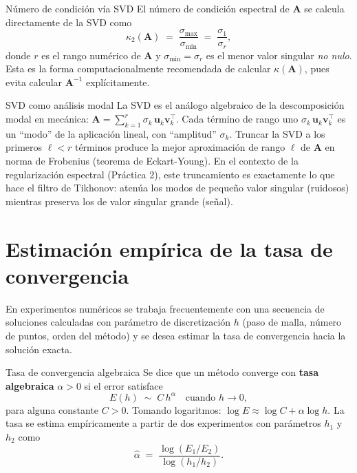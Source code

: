 \begin{proposicion}{Número de condición vía SVD}
\label{prop:cond_svd}
El número de condición espectral de $\mathbf{A}$ se calcula directamente
de la SVD como
\[
  \kappa_2(\mathbf{A}) \;=\; \frac{\sigma_{\max}}{\sigma_{\min}} \;=\; \frac{\sigma_1}{\sigma_r},
\]
donde $r$ es el rango numérico de $\mathbf{A}$ y $\sigma_{\min} = \sigma_r$
es el menor valor singular \emph{no nulo}. Esta es la forma computacionalmente
recomendada de calcular $\kappa(\mathbf{A})$, pues evita calcular
$\mathbf{A}^{-1}$ explícitamente.
\end{proposicion}

\begin{fisicaconexion}{SVD como análisis modal}
La SVD es el análogo algebraico de la descomposición modal en mecánica:
$\mathbf{A} = \sum_{k=1}^r \sigma_k\, \mathbf{u}_k \mathbf{v}_k^\top$.
Cada término de rango uno $\sigma_k\,\mathbf{u}_k\mathbf{v}_k^\top$ es un
``modo'' de la aplicación lineal, con ``amplitud'' $\sigma_k$. Truncar
la SVD a los primeros $\ell < r$ términos produce la mejor aproximación de
rango $\ell$ de $\mathbf{A}$ en norma de Frobenius (teorema de Eckart-Young).
En el contexto de la regularización espectral (Práctica 2), este truncamiento
es exactamente lo que hace el filtro de Tikhonov: atenúa los modos de
pequeño valor singular (ruidosos) mientras preserva los de valor singular
grande (señal).
\end{fisicaconexion}

\section{Estimación empírica de la tasa de convergencia}
\label{ap:convergencia}

En experimentos numéricos se trabaja frecuentemente con una secuencia de
soluciones calculadas con parámetro de discretización $h$ (paso de malla,
número de puntos, orden del método) y se desea estimar la tasa de
convergencia hacia la solución exacta.

\begin{definicion}{Tasa de convergencia algebraica}
\label{def:tasa_conv}
Se dice que un método converge con \textbf{tasa algebraica} $\alpha > 0$
si el error satisface
\[
  E(h) \;\sim\; C\,h^\alpha \quad \text{cuando } h \to 0,
\]
para alguna constante $C > 0$. Tomando logaritmos:
$\log E \approx \log C + \alpha \log h$.
La tasa se estima empíricamente a partir de dos experimentos con parámetros
$h_1$ y $h_2$ como
\[
  \hat{\alpha} \;=\; \frac{\log(E_1/E_2)}{\log(h_1/h_2)}.
\]
\end{definicion}

